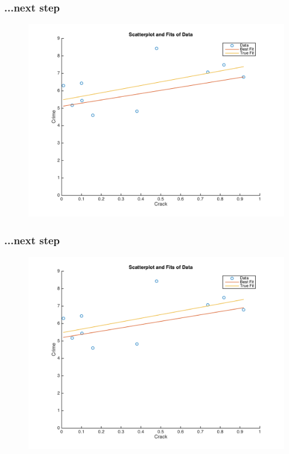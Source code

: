 \documentclass{beamer}
\begin{document}
\begin{frame}
\frametitle[alignment=center]{...next step}
\begin{figure}
\centering
\includegraphics[scale=0.5]{Newton_OLS_Figure_12.png}
\end{figure}
\end{frame}

\begin{frame}
\frametitle[alignment=center]{...next step}
\begin{figure}
\centering
\includegraphics[scale=0.5]{Newton_OLS_Figure_13.png}
\end{figure}
\end{frame}
\end{document}
